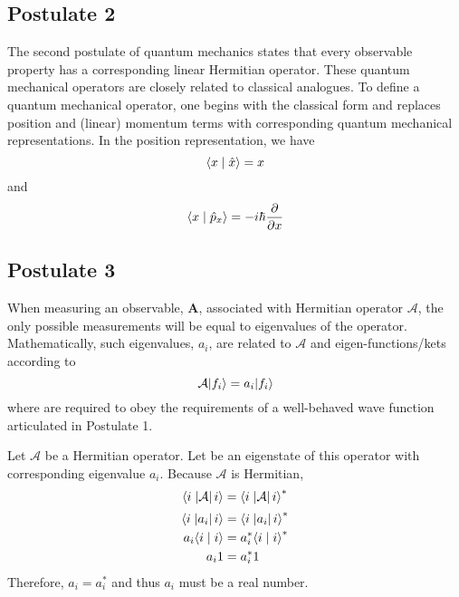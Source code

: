 %
\subsection{Postulate 2}
The second postulate of quantum mechanics states that every observable
property has a corresponding linear Hermitian operator. These quantum
mechanical operators are closely related to classical analogues. To define
a quantum mechanical operator, one begins with the classical form and
replaces position and (linear) momentum terms with corresponding quantum
mechanical representations. In the position representation, we have
%
\begin{equation}
\displaystyle
  \braket{x}{\hat{x}} = x
\end{equation}
%
and
%
\begin{equation}
\displaystyle
  \braket{x}{\hat{p}_x} = -i\hbar\frac{\partial{}}{\partial{}{x}}
\end{equation}
%

%
\subsection{Postulate 3}
When measuring an observable, $\mathbf{A}$, associated with Hermitian
operator $\mathcal{A}$, the only possible measurements will be equal to
eigenvalues of the operator. Mathematically, such eigenvalues, ${a_i}$, are
related to $\mathcal{A}$ and eigen-functions/kets according to
%
\begin{equation}
\displaystyle
  \mathcal{A}\ket{f_i} = a_i\ket{f_i}
\end{equation}
%
where  are required to obey the requirements of a well-behaved
wave function articulated in Postulate 1.

%
%
\begin{hphproof}
Let $\mathcal{A}$ be a Hermitian operator. Let  be an eigenstate of this operator with corresponding eigenvalue $a_i$. Because $\mathcal{A}$ is Hermitian,
%
\begin{equation*}
\displaystyle
  \braketop{i}{\mathcal{A}}{i} = \braketop{i}{\mathcal{A}}{i}^*
\end{equation*}
%
\begin{equation*}
\displaystyle
\begin{split}
  \braketop{i}{a_i}{i} ={}& \braketop{i}{a_i}{i}^*   \\
  a_i\braket{i}{i} ={}& a_i^* \braket{i}{i}^*   \\
  a_i 1 ={}& a_i^* 1
\end{split}
\end{equation*}
Therefore, $a_i = a_i^*$ and thus $a_i$ must be a real number.
%
\qedfilled
\end{hphproof}
%

